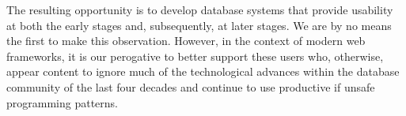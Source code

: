 The resulting opportunity is to develop database systems that provide
usability at both the early stages and, subsequently, at later
stages. We are by no means the first to make this
observation. However, in the context of modern web frameworks, it is
our perogative to better support these users who, otherwise, appear
content to ignore much of the technological advances within the
database community of the last four decades and continue to use
productive if unsafe programming patterns.




